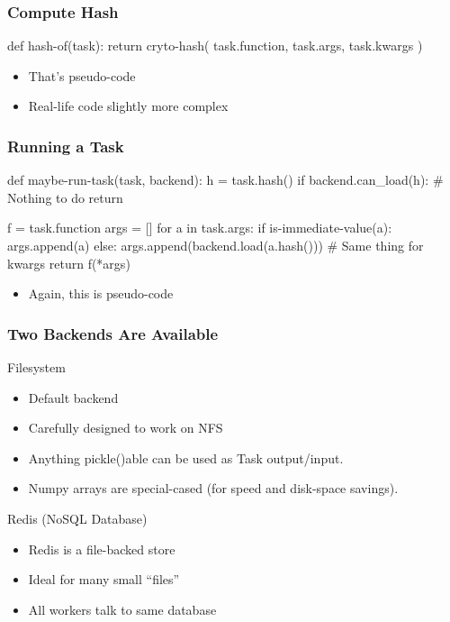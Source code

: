 \documentclass{beamer}
\begin{document}
\begin{frame}[fragile]
\frametitle{Compute Hash}

\begin{python}
def hash-of(task):
    return cryto-hash( { task.function, task.args, task.kwargs })
\end{python}

\begin{itemize}
\item That's \alert{pseudo-code}
\item Real-life code \alert{slightly more complex}
\end{itemize}

\end{frame}

\begin{frame}[fragile]
\frametitle{Running a Task}

\begin{python}
def maybe-run-task(task, backend):
    h = task.hash()
    if backend.can_load(h):
        # Nothing to do
        return
\end{python}
\pause
\begin{python}
    f = task.function
    args = []
    for a in task.args:
        if is-immediate-value(a):
            args.append(a)
        else:
            args.append(backend.load(a.hash()))
    # Same thing for kwargs
    return f(*args)

\end{python}

\begin{itemize}
\item Again, this is \alert{pseudo-code}
\end{itemize}

\end{frame}

\begin{frame}[fragile]
\frametitle{Two Backends Are Available}
\begin{block}{Filesystem}
\begin{itemize}
\item Default backend
\item Carefully designed to work on NFS
\item Anything pickle()able can be used as Task output/input.
\item Numpy arrays are special-cased (for speed and disk-space savings).
\end{itemize}
\end{block}

\begin{block}{Redis (NoSQL Database)}
\begin{itemize}
\item Redis is a file-backed store
\item Ideal for many small ``files''
\item All workers talk to same database
\end{itemize}
\end{block}

\end{frame}
\end{document}
